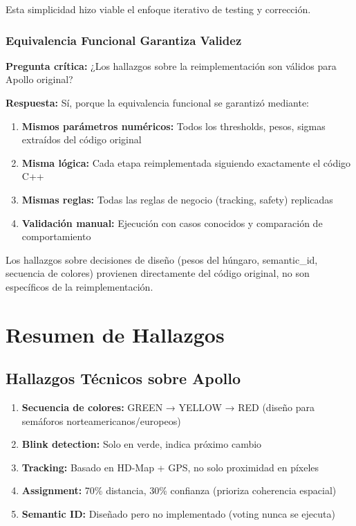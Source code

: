 Esta simplicidad hizo viable el enfoque iterativo de testing y corrección.

\subsubsection{Equivalencia Funcional Garantiza Validez}

\textbf{Pregunta crítica:} ¿Los hallazgos sobre la reimplementación son válidos para Apollo original?

\textbf{Respuesta:} Sí, porque la equivalencia funcional se garantizó mediante:

\begin{enumerate}
    \item \textbf{Mismos parámetros numéricos:} Todos los thresholds, pesos, sigmas extraídos del código original
    \item \textbf{Misma lógica:} Cada etapa reimplementada siguiendo exactamente el código C++
    \item \textbf{Mismas reglas:} Todas las reglas de negocio (tracking, safety) replicadas
    \item \textbf{Validación manual:} Ejecución con casos conocidos y comparación de comportamiento
\end{enumerate}

Los hallazgos sobre decisiones de diseño (pesos del húngaro, semantic\_id, secuencia de colores) provienen directamente del código original, no son específicos de la reimplementación.

\section{Resumen de Hallazgos}

\subsection{Hallazgos Técnicos sobre Apollo}

\begin{enumerate}
    \item \textbf{Secuencia de colores:} GREEN → YELLOW → RED (diseño para semáforos norteamericanos/europeos)
    \item \textbf{Blink detection:} Solo en verde, indica próximo cambio
    \item \textbf{Tracking:} Basado en HD-Map + GPS, no solo proximidad en píxeles
    \item \textbf{Assignment:} 70\% distancia, 30\% confianza (prioriza coherencia espacial)
    \item \textbf{Semantic ID:} Diseñado pero no implementado (voting nunca se ejecuta)
\end{enumerate}

